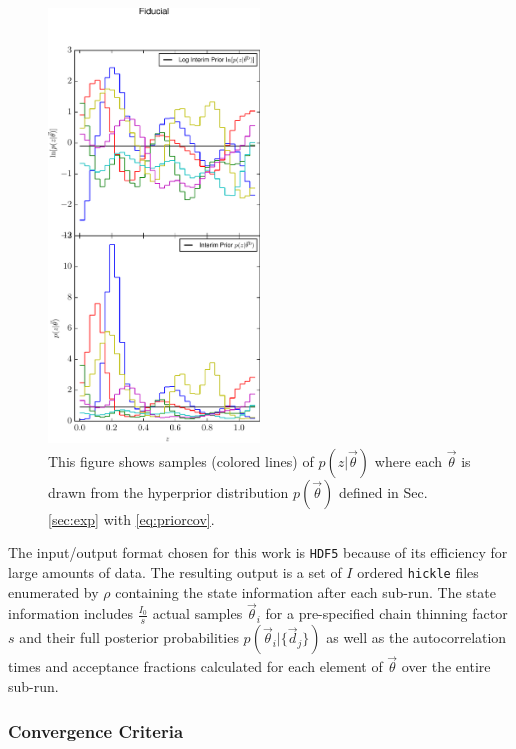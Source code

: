 \documentclass[preprint]{aastex}
\begin{document}
\begin{figure}
\includegraphics[width=0.5\textwidth]{figs/null/priorsamps.pdf}
\caption{This figure shows samples (colored lines) of $p(z|\vec{\theta})$ where 
each $\vec{\theta}$ is drawn from the hyperprior distribution $p(\vec{\theta})$ 
defined in Sec. \ref{sec:exp} with \ref{eq:priorcov}.}
\label{fig:prior}
\end{figure}

The input/output format chosen for this work is \texttt{HDF5} because of its 
efficiency for large amounts of data.  The resulting output is a set of $I$ 
ordered \texttt{hickle} files enumerated by $\rho$ containing the state 
information after each sub-run.  The state information includes 
$\frac{I_{0}}{s}$ actual samples $\vec{\theta}_{i}$ for a pre-specified chain 
thinning factor $s$ and their full posterior probabilities 
$p(\vec{\theta}_{i}|\{\vec{d}_{j}\})$ as well as the autocorrelation times and 
acceptance fractions calculated for each element of $\vec{\theta}$ over the 
entire sub-run.  

\subsubsection{Convergence Criteria}
\label{sec:acorr}
\end{document}
